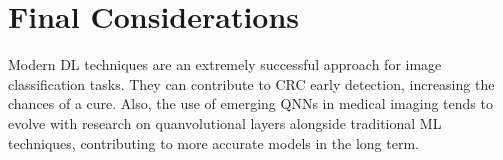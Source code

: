\section{Final Considerations}
\label{sec_final_considerations}
Modern \gls{DL} techniques are an extremely successful approach for image classification tasks. They can contribute to \gls{CRC} early detection, increasing the chances of a cure. Also, the use of emerging \glspl{QNN} in medical imaging tends to evolve with research on quanvolutional layers alongside traditional \gls{ML} techniques, contributing to more accurate models in the long term.
